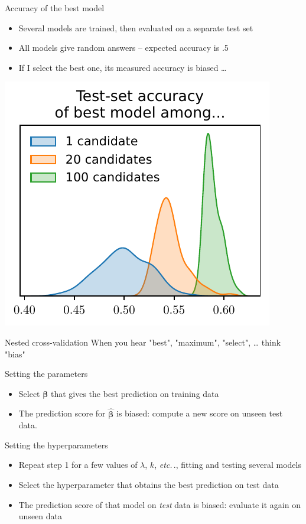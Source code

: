 \documentclass[presentation,mathserif,table]{beamer}
\newcommand{\etc}{\emph{etc.}\,}
\newcommand{\bbeta}{{\mathbold \beta}}
\begin{document}
\begin{frame}[label={sec:orgd083ac6}]{Accuracy of the best model}
\begin{itemize}
\item Several models are trained, then evaluated on a separate test set
\item All models give random answers -- expected accuracy is .5
\item If I select the best one, its measured accuracy is biased \ldots{}
\end{itemize}
\begin{center}
\includegraphics[height=.5 \textheight]{figures/generated/hyperparameter_overfitting/accuracies.pdf}
\end{center}
\end{frame}
\begin{frame}[label={sec:org255f3e7}]{Nested cross-validation}
When you hear "best", "maximum", "select", \ldots{} think "bias"
\begin{block}{Setting the parameters}
\begin{itemize}
\item \alert{Select} \(\bbeta\) that gives the \alert{best} prediction on training data
\item The prediction score for \(\hat{\bbeta}\) is biased: compute a new score on unseen test data.
\end{itemize}
\end{block}
\begin{block}{Setting the hyperparameters}
\begin{itemize}
\item Repeat step 1 for a few values of \(\lambda\), \(k\), \etc., fitting and testing several models
\item \alert{Select} the hyperparameter that obtains the \alert{best} prediction on test data
\item The prediction score of that model on \emph{test} data is biased: evaluate it again on unseen data
\end{itemize}
\end{block}
\end{frame}
\end{document}
